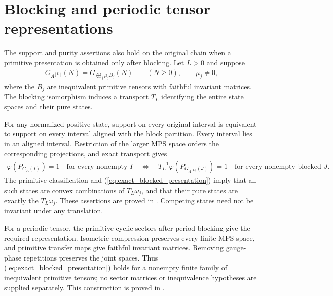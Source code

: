 \documentclass{article}
\begin{document}
\section{Blocking and periodic tensor representations}
The support and purity assertions also hold on the original chain when a
primitive presentation is obtained only after blocking. Let $L>0$ and suppose
\begin{align}
  G_{A^{[L]}}(N)=G_{\bigoplus_j\mu_j B_j}(N)
  \qquad(N\geq0),\qquad \mu_j\ne0,
  \label{eq:exact_blocked_presentation}
\end{align}
where the $B_j$ are inequivalent primitive tensors with faithful invariant
matrices. The blocking isomorphism induces a transport $T_L$ identifying
the entire state spaces and their pure states.

For any normalized positive state, support on every original interval is
equivalent to support on every interval aligned with the block partition.
Every interval lies in an aligned interval. Restriction of the larger MPS
space orders the corresponding projections, and exact transport gives
\begin{align}
  \varphi(P_{G_A(I)})=1\quad\text{for every nonempty }I
  \quad\Longleftrightarrow\quad
  T_L^{-1}\varphi(P_{G_{A^{[L]}}(J)})=1
    \quad\text{for every nonempty blocked }J.
\end{align}
The primitive classification and (\ref{eq:exact_blocked_presentation}) imply
that all such states are convex combinations of $T_L\omega_j$, and that their
pure states are exactly the $T_L\omega_j$. These assertions are proved in
. Competing states
need not be invariant under any translation.

For a periodic tensor, the primitive cyclic sectors after period-blocking
give the required representation. Isometric compression preserves every
finite MPS space, and primitive transfer maps give faithful invariant
matrices. Removing gauge-phase repetitions preserves the joint spaces. Thus
(\ref{eq:exact_blocked_presentation}) holds for a nonempty finite family of
inequivalent primitive tensors; no sector matrices or inequivalence
hypotheses are supplied separately. This construction is proved in
.
\end{document}
